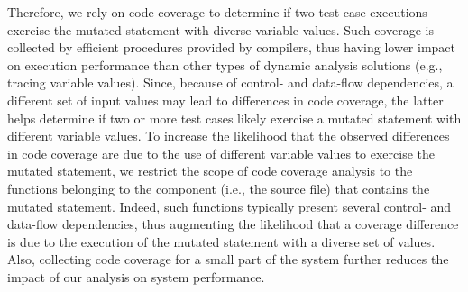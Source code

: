 Therefore, we rely on code coverage to determine if two test case executions exercise the mutated statement with diverse variable values. Such coverage is collected by efficient procedures provided by compilers, thus having lower impact on execution performance than other types of dynamic analysis solutions (e.g., tracing variable values).
Since, because of control- and data-flow dependencies, a different set of input values may lead to differences in code coverage, 
the latter helps determine if two or more test cases likely exercise a mutated statement with different variable values. %
To increase the likelihood that the observed differences in code coverage are due to the use of different variable values to exercise the mutated statement, we restrict the scope of code coverage analysis 
to the functions belonging to the component (i.e., the source file) that contains the mutated statement.
Indeed, such functions typically present several control- and data-flow dependencies, thus 
augmenting the likelihood that a coverage difference is due to the execution of the mutated statement with a diverse set of values. Also, collecting code coverage for a small part of the system further reduces the impact of our analysis on system performance.


